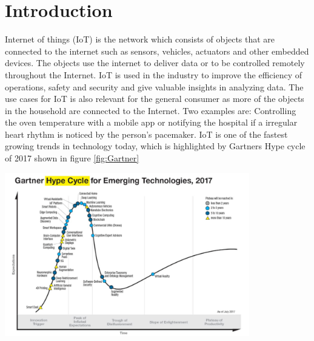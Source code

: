 
\chapter{Introduction}



Internet of things (IoT) is the network which consists of objects that are connected to the internet such as sensors, vehicles, actuators and other embedded devices. The objects use the internet to deliver data or to be controlled remotely throughout the Internet. IoT is used in the industry to improve the efficiency of operations, safety and security and give valuable insights in analyzing data. The use cases for IoT is also relevant for the general consumer as more of the objects in the household are connected to the Internet. Two examples are: Controlling the oven temperature with a mobile app or notifying the hospital if a irregular heart rhythm is noticed by the person's pacemaker. IoT is one of the fastest growing trends in technology today, which is highlighted by Gartners Hype cycle of 2017 shown in figure \ref{fig:Gartner}\\


\begin{minipage}[t]{0.8\textwidth}
    \centering
    \includegraphics[width=0.8\textwidth]{Images/Gartner.PNG}\\
    \label{fig:Gartner}
\end{minipage}
\\




